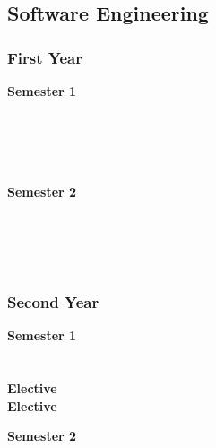 \subsection{Software Engineering}

\subsubsection{First Year}
\begin{center}
\begin{multicols}{2}
\textbf{Semester 1} \\
 \\
 \\
 \\
 \\
\vfill
\columnbreak

\textbf{Semester 2} \\
 \\
 \\
 \\
 \\
\end{multicols}
\end{center}

\subsubsection{Second Year}
\begin{center}
\begin{multicols}{2}
\textbf{Semester 1} \\
 \\
 \\
\textbf{Elective} \\
\textbf{Elective} \\
\vfill
\columnbreak

\textbf{Semester 2} \\
 \\
 \\
 \\
 \\
\end{multicols}
\end{center}

